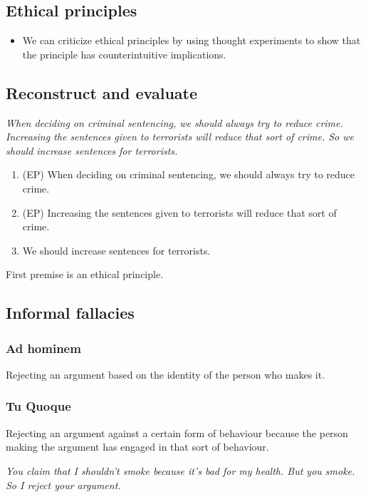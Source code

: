 \subsection{Ethical principles}

\begin{itemize}
    \item We can criticize ethical principles by using thought experiments
        to show that the principle has counterintuitive implications.
\end{itemize}

\subsection{Reconstruct and evaluate}

\textit{When deciding on criminal sentencing, we should always try
to reduce crime. Increasing the sentences given to terrorists will reduce that
sort of crime. So we should increase sentences for terrorists.}

\begin{enumerate}
    \item (EP) When deciding on criminal sentencing, we should always try to
        reduce crime.
    \item (EP) Increasing the sentences given to terrorists will
        reduce that sort of crime.
    \item We should increase sentences for terrorists.
\end{enumerate}

First premise is an ethical principle.

\subsection{Informal fallacies}

\subsubsection{Ad hominem}

Rejecting an argument based on the identity of the person
who makes it.

\subsubsection{Tu Quoque}

Rejecting an argument against a certain form of behaviour because
the person making the argument has engaged in that sort of behaviour.

\textit{You claim that I shouldn't smoke because it's bad for my
health. But you smoke. So I reject your argument.}